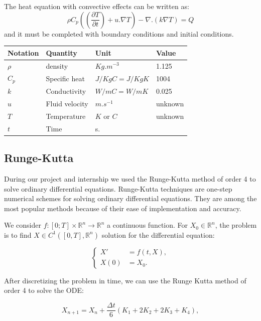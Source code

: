 \documentclass[12pt]{article}
\begin{document}
	\noindent The heat equation with convective effects can be written as:
    $$\rho C_p((\frac{\partial T}{\partial t})+u . \nabla T)-\nabla .(k \nabla T)=Q$$
    and it must be completed  with boundary conditions and initial conditions.
    \newline
	\renewcommand{\arraystretch}{2}
    \begin{tabular}{|R{3cm}|C{3cm}|L{3cm}|L{3cm}|}
    \hline
    Notation & Quantity &Unit & Value   \\
    \hline
    $\rho$ & density & $Kg.m^
    {-3}$ & 1.125  \\[4cm]
    \hline
    $C_p$ & Specific heat & $J/KgC=J/KgK$ & 1004 \\[4cm]
    \hline
    $k$ & Conductivity & $W/mC=W/mK$ & 0.025 \\[4cm]
    \hline
    $u$ & Fluid velocity & $m.s^{-1}$  & unknown \\[4cm]
    \hline
    $T$ & Temperature & $K$ or $C$  & unknown \\[4cm]
    \hline
    $t$ & Time & s. &   \\[4cm]
    \hline
\end{tabular}

	\newpage

    \subsection{Runge-Kutta}
    \noindent During our project and internship we used the Runge-Kutta method of order 4 to solve ordinary differential equations. Runge-Kutta techniques are one-step numerical schemes for solving ordinary differential equations. They are among the most popular methods because of their ease of implementation and accuracy.
    
    \noindent We consider $f : [0; T] \times \mathbb{R}^n \rightarrow \mathbb{R}^n$ a continuous function. For $X_0\in \mathbb{R}^n$, the problem is to find  $X\in C^1([0,T],\mathbb{R}^n)$ solution for the differential equation:
	
	$$\left\{\begin{aligned}
		X'&=f(t,X), \\
		X(0)&=X_0.
	\end{aligned}\right.$$
	
	
	 \noindent After discretizing the problem in time, we can use the Runge Kutta method of order 4 to solve the ODE:
		
		$$X_{n+1}=X_n+\frac{\Delta t}{6}\left(K_1+2K_2+2K_3+K_4\right) ,$$
		
\end{document}

